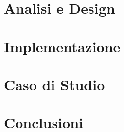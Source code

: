 

\chapter{Analisi e Design}
\label{chap:analisi}



\chapter{Implementazione}
\label{chap:implementazione}



\chapter{Caso di Studio}
\label{chap:caso_studio}



\chapter{Conclusioni}
\label{chap:conclusioni}



